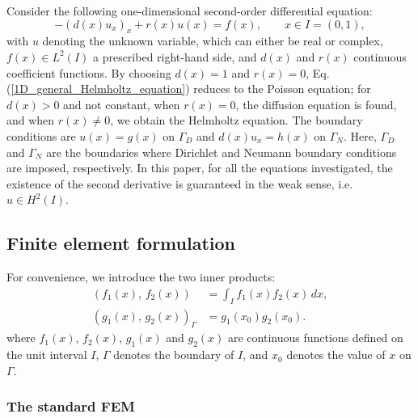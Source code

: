 \documentclass[review,3p]{elsarticle}
\begin{document}
Consider the following one-dimensional second-order differential equation:
\begin{equation}
  -\left(d(x) u_x \right)_x + r(x)u(x) = f(x),\qquad x \in I = (0,1),	\label{1D_general_Helmholtz_equation}
\end{equation}
with $u$ denoting the unknown variable, which can either be real or complex, $f(x) \in L^2 (I)$ a prescribed right-hand side, and $d(x)$ and $r(x)$ continuous coefficient functions.
By choosing $d(x)=1$ and $r(x)=0$, Eq. (\ref{1D_general_Helmholtz_equation}) reduces to the Poisson equation; for $d(x)>0$ and not constant, when $r(x)=0$, the diffusion equation is found, and when $r(x) \neq 0$, we obtain the Helmholtz equation. 
The boundary conditions are $u(x)=g(x)$ on $\Gamma_D$ and $d(x)u_x=h(x)$ on $\Gamma_N$. Here, $\Gamma_D$ and $\Gamma_N$ are the boundaries where Dirichlet and Neumann boundary conditions are imposed, respectively.
In this paper, for all the equations investigated, the existence of the second derivative is guaranteed in the weak sense, i.e. $u \in H^2 (I)$.

\subsection{Finite element formulation} 	\label{FE formulation}

For convenience, we introduce the two inner products:
 \begin{subequations}
  \begin{align}
   (f_1(x), \,f_2(x) ) &= \int _I f_1(x) f_2(x) \, dx,	\\
   (g_1(x), \,g_2(x) )_{\Gamma} &= g_1(x_0) g_2(x_0).
  \end{align}
 \end{subequations}
where $f_1(x)$, $f_2(x)$, $g_1(x)$ and $g_2(x)$ are continuous functions defined on the unit interval $I$, $\Gamma$ denotes the boundary of $I$, and $x_0$ denotes the value of $x$ on $\Gamma$.

\subsubsection{The standard FEM}
\end{document}
